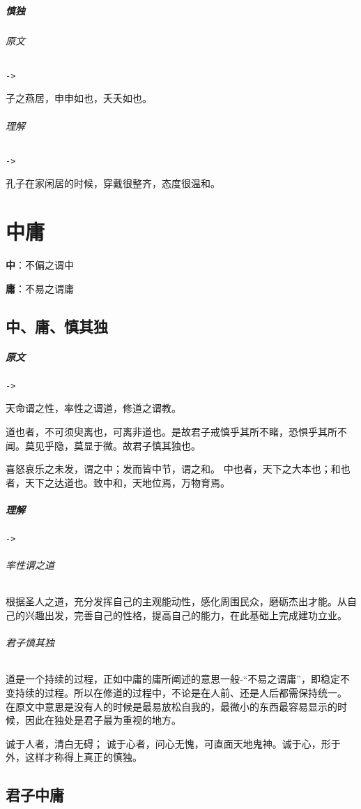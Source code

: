 \documentclass[UTF8,a4paper,8pt]{ctexbook}
\begin{document}
				
		\paragraph{慎独}
			\subparagraph{原文}\verb|->|
			
				子之燕居，申申如也，夭夭如也。
			
			\subparagraph{理解}\verb|->|
			
				孔子在家闲居的时候，穿戴很整齐，态度很温和。
			
\chapter{中庸}
	\textbf{中}：不偏之谓中
	
	\textbf{庸}：不易之谓庸
	
	\section{中、庸、慎其独}
		\paragraph{原文}\verb|->|
		
			天命谓之性，率性之谓道，修道之谓教。
			
			道也者，不可须臾离也，可离非道也。是故君子戒慎乎其所不睹，恐惧乎其所不闻。莫见乎隐，莫显于微。故君子慎其独也。
		
			喜怒哀乐之未发，谓之中；发而皆中节，谓之和。 中也者，天下之大本也；和也者，天下之达道也。致中和，天地位焉，万物育焉。
			
		\paragraph{理解}\verb|->|
			
			\subparagraph{率性谓之道} 根据圣人之道，充分发挥自己的主观能动性，感化周围民众，磨砺杰出才能。从自己的兴趣出发，完善自己的性格，提高自己的能力，在此基础上完成建功立业。
			
			\subparagraph{君子慎其独} 道是一个持续的过程，正如中庸的庸所阐述的意思一般-“不易之谓庸”，即稳定不变持续的过程。所以在修道的过程中，不论是在人前、还是人后都需保持统一。 在原文中意思是没有人的时候是最易放松自我的，最微小的东西最容易显示的时候，因此在独处是君子最为重视的地方。
			
			诚于人者，清白无碍； 诚于心者，问心无愧，可直面天地鬼神。诚于心，形于外，这样才称得上真正的慎独。
	
	\section{君子中庸}
\end{document}
